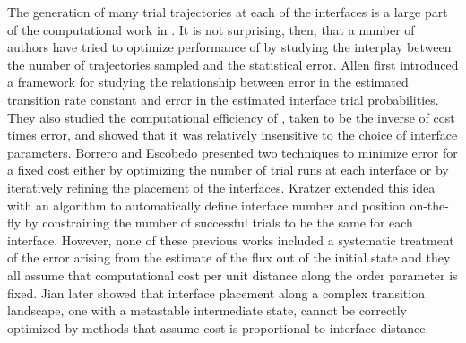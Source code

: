 The generation of many trial trajectories at each of the interfaces is a large part of the computational work in . It is not surprising, then, that a number of authors have tried to optimize performance of  by studying the interplay between the number of trajectories sampled and the statistical error. Allen {\etal}\supercite{Allen:2006ch} first introduced a framework for studying the relationship between error in the estimated transition rate constant and error in the estimated interface trial probabilities. They also studied the computational efficiency of , taken to be the inverse of cost times error, and showed that it was relatively insensitive to the choice of interface parameters. Borrero and Escobedo\supercite{Borrero:2008il} presented two techniques to minimize  error for a fixed cost either by optimizing the number of trial runs at each interface or by iteratively refining the placement of the interfaces. Kratzer {\etal}\supercite{Kratzer:2013fs} extended this idea with an algorithm to automatically define interface number and position on-the-fly by constraining the number of successful trials to be the same for each interface. However, none of these previous works included a systematic treatment of the error arising from the estimate of the flux out of the initial state and they all assume that computational cost per unit distance along the order parameter is fixed. Jian {\etal}\supercite{Jiang:2013jc} later showed that interface placement along a complex transition landscape, {\eg} one with a metastable intermediate state, cannot be correctly optimized by methods that assume cost is proportional to interface distance.


